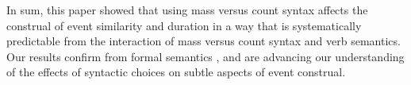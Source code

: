 \documentclass[preprint,12pt,authoryear]{elsarticle}
\begin{document}
In sum, this paper showed that using mass versus count syntax affects the construal of event similarity and duration in a way that is systematically predictable from the interaction of mass versus count syntax and verb semantics. Our results confirm  from formal semantics , and are advancing our understanding of the effects of syntactic choices on subtle aspects of event construal.

\newpage

\clearpage




\end{document}
